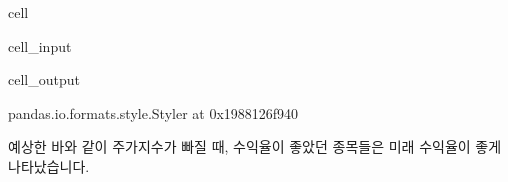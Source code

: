 \documentclass[letterpaper,10pt,english]{jupyterBook}
\begin{document}
\begin{sphinxuseclass}{cell}
\begin{sphinxVerbatimInput}
\begin{sphinxuseclass}{cell_input}
\begin{sphinxVerbatim}[commandchars=\\\{\}]
      \PYG{p}{[} \PYG{p}{]} 

\end{sphinxVerbatim}

\end{sphinxuseclass}\end{sphinxVerbatimInput}
\begin{sphinxVerbatimOutput}

\begin{sphinxuseclass}{cell_output}
\begin{sphinxVerbatim}[commandchars=\\\{\}]
\PYGZlt{}pandas.io.formats.style.Styler at 0x1988126f940\PYGZgt{}
\end{sphinxVerbatim}

\end{sphinxuseclass}\end{sphinxVerbatimOutput}

\end{sphinxuseclass}
\sphinxAtStartPar
 예상한 바와 같이 주가지수가 빠질 때, 수익율이 좋았던 종목들은 미래 수익율이 좋게 나타났습니다.
\end{document}
